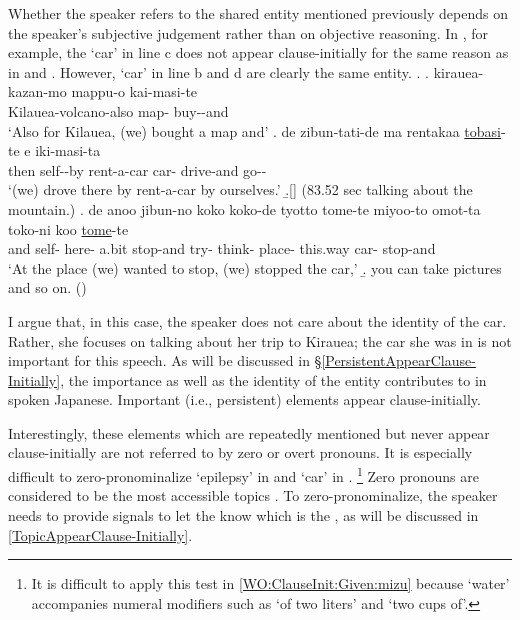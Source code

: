 Whether the speaker refers to the shared entity mentioned previously
depends on the speaker's subjective judgement rather than on objective reasoning.
In \Next, for example,
the   `car' in line c does not appear clause-initially for the same reason as in \LLast and \Last.
However,  `car' in line b and d are clearly the same entity.
%
\ex.\label{WO:ClauseInit:Given:kuruma}
 \ag. kirauea-kazan-mo mappu-o kai-masi-te \\
 		Kilauea-volcano-also map- buy--and \\
		`Also for Kilauea, (we) bought a map and'
 \bg. de zibun-tati-de ma rentakaa  \ul{tobasi}-te e iki-masi-ta \\
 		then self--by  rent-a-car car- drive-and  go-- \\
		`(we) drove there by rent-a-car by ourselves.'
 \b.[] (83.52 sec talking about the mountain.)
 \bg. de anoo jibun-no koko koko-de tyotto tome-te miyoo-to omot-ta toko-ni koo  \ul{tome}-te \\
 		and  self-  here- a.bit stop-and try- think- place- this.way car- stop-and \\
	 	`At the place (we) wanted to stop, (we) stopped the car,'
 \b. you can take pictures and so on.
 \hfill{()}
%

I argue that, in this case, the speaker does not care about the identity of the car.
Rather, she focuses on talking about her trip to Kirauea;
the car she was in is not important for this speech.
As will be discussed in \S \ref{PersistentAppearClause-Initially}, the
importance as well as the identity of the entity contributes to  in spoken Japanese.
Important (i.e., persistent) elements appear clause-initially.

Interestingly,
these elements which are repeatedly mentioned but never appear clause-initially are not referred to by zero or overt pronouns.
It is especially difficult to zero-pronominalize  `epilepsy' in \LLast[b-f] and  `car' in \Last[d].%
 \footnote{
 It is difficult to apply this test in \ref{WO:ClauseInit:Given:mizu} because  `water' accompanies numeral modifiers such as 
 `of two liters' and `two cups of'.
 }
Zero pronouns are considered to be the most accessible topics \cite[17]{givon83}.
To zero-pronominalize,
the speaker needs to provide signals to let the  know which is the , as will be discussed in \ref{TopicAppearClause-Initially}.

